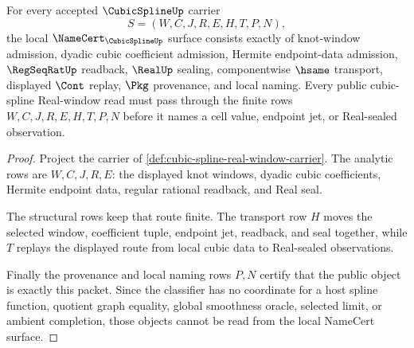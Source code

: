 \begin{theorem}
\label{thm:cubic-spline-real-window-namecert-obligations}
For every accepted $\CubicSplineUp$ carrier
$$
S=(W,C,J,R,E,H,T,P,N),
$$
the local $\NameCert_{\CubicSplineUp}$ surface consists exactly of knot-window admission, dyadic cubic coefficient admission, Hermite endpoint-data admission, $\RegSeqRatUp$ readback, $\RealUp$ sealing, componentwise $\hsame$ transport, displayed $\Cont$ replay, $\Pkg$ provenance, and local naming. Every public cubic-spline Real-window read must pass through the finite rows $W,C,J,R,E,H,T,P,N$ before it names a cell value, endpoint jet, or Real-sealed observation.
\end{theorem}
\begin{proof}
Project the carrier of \autoref{def:cubic-spline-real-window-carrier}. The analytic rows are $W,C,J,R,E$: the displayed knot windows, dyadic cubic coefficients, Hermite endpoint data, regular rational readback, and Real seal.

The structural rows keep that route finite. The transport row $H$ moves the selected window, coefficient tuple, endpoint jet, readback, and seal together, while $T$ replays the displayed route from local cubic data to Real-sealed observations.

Finally the provenance and local naming rows $P,N$ certify that the public object is exactly this packet. Since the classifier has no coordinate for a host spline function, quotient graph equality, global smoothness oracle, selected limit, or ambient completion, those objects cannot be read from the local NameCert surface.
\end{proof}

